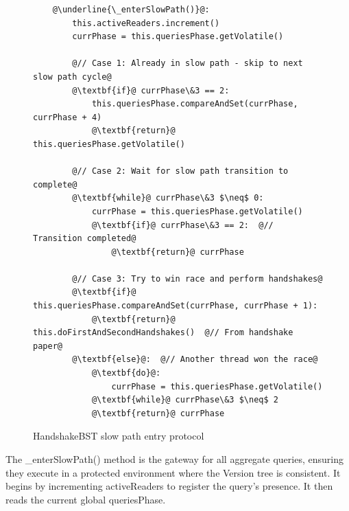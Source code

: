 \documentclass[acmsmall,screen,nonacm]{acmart}
\newcommand{\codestyle}[1]{{{\fontsize{9}{10}\ttfamily #1}}}
\begin{document}
\begin{figure}[H]
\begin{lstlisting}
    @\underline{\_enterSlowPath()}@:
        this.activeReaders.increment()
        currPhase = this.queriesPhase.getVolatile()
        
        @// Case 1: Already in slow path - skip to next slow path cycle@
        @\textbf{if}@ currPhase\&3 == 2:
            this.queriesPhase.compareAndSet(currPhase, currPhase + 4)
            @\textbf{return}@ this.queriesPhase.getVolatile()
        
        @// Case 2: Wait for slow path transition to complete@
        @\textbf{while}@ currPhase\&3 $\neq$ 0:
            currPhase = this.queriesPhase.getVolatile()
            @\textbf{if}@ currPhase\&3 == 2:  @// Transition completed@
                @\textbf{return}@ currPhase
        
        @// Case 3: Try to win race and perform handshakes@
        @\textbf{if}@ this.queriesPhase.compareAndSet(currPhase, currPhase + 1):
            @\textbf{return}@ this.doFirstAndSecondHandshakes()  @// From handshake paper@
        @\textbf{else}@:  @// Another thread won the race@
            @\textbf{do}@:
                currPhase = this.queriesPhase.getVolatile()
            @\textbf{while}@ currPhase\&3 $\neq$ 2
            @\textbf{return}@ currPhase
\end{lstlisting}
\caption{HandshakeBST slow path entry protocol}
\label{fig:mybstnext-enterslowpath}
\end{figure}

The \codestyle{\_enterSlowPath()} method is the gateway for all aggregate queries, ensuring they execute in a protected environment where the Version tree is consistent. It begins by incrementing \codestyle{activeReaders} to register the query's presence. It then reads the current global \codestyle{queriesPhase}.
\end{document}
